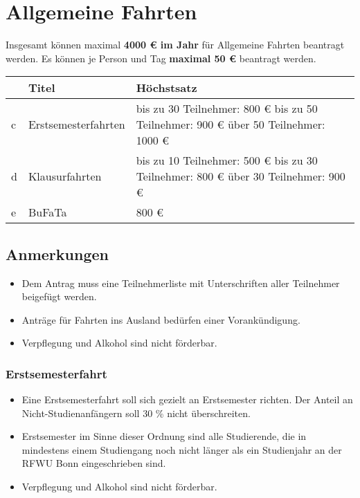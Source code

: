 \documentclass{article}
\begin{document}
\section{Allgemeine Fahrten}
    Insgesamt können maximal \textbf{4000 € im Jahr} für Allgemeine Fahrten beantragt werden. \newline
    Es können je Person und Tag \textbf{maximal 50 €} beantragt werden.\\
    
    \setlength\extrarowheight{2mm} \sffamily    
    \begin{tabular}{l||L{6cm}|L{7cm}}
    
    	&\textbf{Titel} &  \textbf{Höchstsatz}\\ \hline \hline
    	c &
    	Erstsemesterfahrten &
    	
    	bis zu 30 Teilnehmer: 800 € \newline
    	bis zu 50 Teilnehmer: 900 € \newline
    	über 50 Teilnehmer: 1000 €\\ \hline
    
    	d &
    	Klausurfahrten &
    	bis zu 10 Teilnehmer: 500 € \newline
    	bis zu 30 Teilnehmer: 800 € \newline
    	über 30 Teilnehmer: 900 €  \\ \hline
    	
    	e &
    	BuFaTa &
    	800 € \\
    \end{tabular}
    \rmfamily
    \subsection{Anmerkungen}
        \begin{itemize}
            \item Dem Antrag muss eine Teilnehmerliste mit Unterschriften aller Teilnehmer beigefügt werden.
            \item Anträge für Fahrten ins Ausland bedürfen einer Vorankündigung.
            \item Verpflegung und Alkohol sind nicht förderbar.
        \end{itemize}
        \subsubsection{Erstsemesterfahrt}
            \begin{itemize}
                \item  Eine Erstsemesterfahrt soll sich gezielt an Erstsemester richten.
					Der Anteil an Nicht-Studienanfängern soll 30 \% nicht überschreiten.
				\item Erstsemester im Sinne dieser Ordnung sind alle Studierende, die in mindestens einem Studiengang noch nicht länger als ein Studienjahr an der RFWU Bonn eingeschrieben sind.
				\item Verpflegung und Alkohol sind nicht förderbar.
            \end{itemize}
\end{document}
